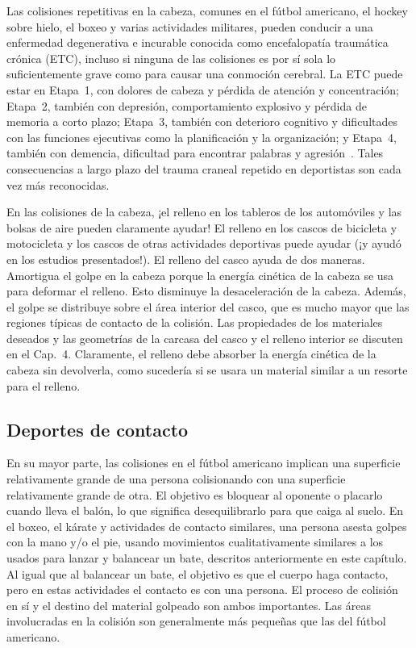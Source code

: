 \documentclass[12pt]{book}
\begin{document}
Las colisiones repetitivas en la cabeza, comunes en el fútbol americano, el hockey sobre hielo, el boxeo y varias actividades militares, pueden conducir a una enfermedad degenerativa e incurable conocida como encefalopatía traumática crónica (ETC), incluso si ninguna de las colisiones es por sí sola lo suficientemente grave como para causar una conmoción cerebral. La ETC puede estar en Etapa~1, con dolores de cabeza y pérdida de atención y concentración; Etapa~2, también con depresión, comportamiento explosivo y pérdida de memoria a corto plazo; Etapa~3, también con deterioro cognitivo y dificultades con las funciones ejecutivas como la planificación y la organización; y Etapa~4, también con demencia, dificultad para encontrar palabras y agresión~\cite{ref12,ref56,ref92}. Tales consecuencias a largo plazo del trauma craneal repetido en deportistas son cada vez más reconocidas.

En las colisiones de la cabeza, ¡el relleno en los tableros de los automóviles y las bolsas de aire pueden claramente ayudar! El relleno en los cascos de bicicleta y motocicleta y los cascos de otras actividades deportivas puede ayudar (¡y ayudó en los estudios presentados!). El relleno del casco ayuda de dos maneras. Amortigua el golpe en la cabeza porque la energía cinética de la cabeza se usa para deformar el relleno. Esto disminuye la desaceleración de la cabeza. Además, el golpe se distribuye sobre el área interior del casco, que es mucho mayor que las regiones típicas de contacto de la colisión. Las propiedades de los materiales deseados y las geometrías de la carcasa del casco y el relleno interior se discuten en el Cap.~4. Claramente, el relleno debe absorber la energía cinética de la cabeza sin devolverla, como sucedería si se usara un material similar a un resorte para el relleno.

\subsection{Deportes de contacto}

En su mayor parte, las colisiones en el fútbol americano implican una superficie relativamente grande de una persona colisionando con una superficie relativamente grande de otra. El objetivo es bloquear al oponente o placarlo cuando lleva el balón, lo que significa desequilibrarlo para que caiga al suelo. En el boxeo, el kárate y actividades de contacto similares, una persona asesta golpes con la mano y/o el pie, usando movimientos cualitativamente similares a los usados para lanzar y balancear un bate, descritos anteriormente en este capítulo. Al igual que al balancear un bate, el objetivo es que el cuerpo haga contacto, pero en estas actividades el contacto es con una persona. El proceso de colisión en sí y el destino del material golpeado son ambos importantes. Las áreas involucradas en la colisión son generalmente más pequeñas que las del fútbol americano.
\end{document}
